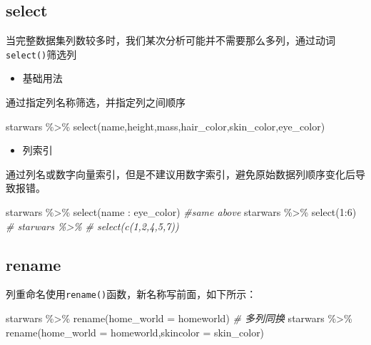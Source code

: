 \documentclass[
]{book}
\newenvironment{Shaded}{\begin{snugshade}}{\end{snugshade}}
\newcommand{\AttributeTok}[1]{\textcolor[rgb]{0.77,0.63,0.00}{#1}}
\newcommand{\CommentTok}[1]{\textcolor[rgb]{0.56,0.35,0.01}{\textit{#1}}}
\newcommand{\DecValTok}[1]{\textcolor[rgb]{0.00,0.00,0.81}{#1}}
\newcommand{\FunctionTok}[1]{\textcolor[rgb]{0.00,0.00,0.00}{#1}}
\newcommand{\NormalTok}[1]{#1}
\newcommand{\SpecialCharTok}[1]{\textcolor[rgb]{0.00,0.00,0.00}{#1}}
\providecommand{\tightlist}{%
  \setlength{\itemsep}{0pt}\setlength{\parskip}{0pt}}
\begin{document}
\hypertarget{select}{%
\subsection{select}\label{select}}

当完整数据集列数较多时，我们某次分析可能并不需要那么多列，通过动词\texttt{select()}筛选列

\begin{itemize}
\tightlist
\item
  基础用法
\end{itemize}

通过指定列名称筛选，并指定列之间顺序

\begin{Shaded}
\begin{Highlighting}[]
\NormalTok{starwars }\SpecialCharTok{\%\textgreater{}\%} 
  \FunctionTok{select}\NormalTok{(name,height,mass,hair\_color,skin\_color,eye\_color)}
\end{Highlighting}
\end{Shaded}

\begin{itemize}
\tightlist
\item
  列索引
\end{itemize}

通过列名或数字向量索引，但是不建议用数字索引，避免原始数据列顺序变化后导致报错。

\begin{Shaded}
\begin{Highlighting}[]
\NormalTok{starwars }\SpecialCharTok{\%\textgreater{}\%} 
  \FunctionTok{select}\NormalTok{(name }\SpecialCharTok{:}\NormalTok{ eye\_color)}
\CommentTok{\#same above}
\NormalTok{starwars }\SpecialCharTok{\%\textgreater{}\%} 
  \FunctionTok{select}\NormalTok{(}\DecValTok{1}\SpecialCharTok{:}\DecValTok{6}\NormalTok{)}
\CommentTok{\# starwars \%\textgreater{}\% }
\CommentTok{\#   select(c(1,2,4,5,7))}
\end{Highlighting}
\end{Shaded}

\hypertarget{rename}{%
\subsection{rename}\label{rename}}

列重命名使用\texttt{rename()}函数，新名称写前面，如下所示：

\begin{Shaded}
\begin{Highlighting}[]
\NormalTok{starwars }\SpecialCharTok{\%\textgreater{}\%} \FunctionTok{rename}\NormalTok{(}\AttributeTok{home\_world =}\NormalTok{ homeworld)}
\CommentTok{\# 多列同换}
\NormalTok{starwars }\SpecialCharTok{\%\textgreater{}\%} \FunctionTok{rename}\NormalTok{(}\AttributeTok{home\_world =}\NormalTok{ homeworld,}\AttributeTok{skincolor =}\NormalTok{ skin\_color)}
\end{Highlighting}
\end{Shaded}
\end{document}
